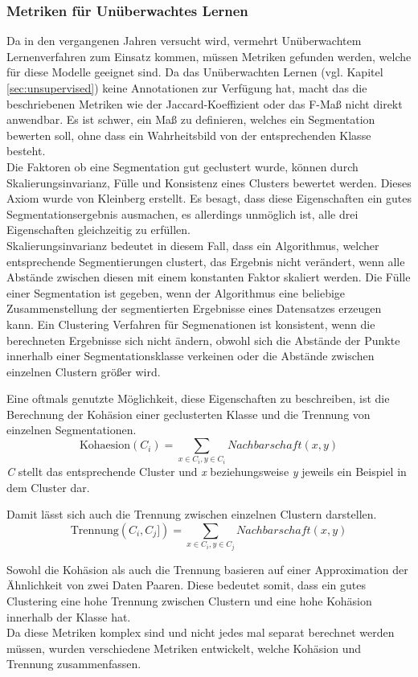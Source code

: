\subsubsection*{Metriken für Unüberwachtes Lernen}
Da in den vergangenen Jahren versucht wird, vermehrt Unüberwachtem Lernenverfahren zum Einsatz kommen, müssen Metriken gefunden werden, welche für diese Modelle geeignet sind. Da das Unüberwachten Lernen (vgl. Kapitel \ref{sec:unsupervised}) keine Annotationen zur Verfügung hat, macht das die beschriebenen Metriken wie der Jaccard-Koeffizient oder das F-Maß nicht direkt anwendbar. Es ist schwer, ein Maß zu definieren, welches ein Segmentation bewerten soll, ohne dass ein Wahrheitsbild von der entsprechenden Klasse besteht.\\
Die Faktoren ob eine Segmentation gut geclustert wurde, können durch Skalierungsinvarianz, Fülle und Konsistenz eines Clusters \cite{evaluationMetricsUnsupervisedLearningAlgorithmsPalacioniño2019} bewertet werden. Dieses Axiom wurde von Kleinberg \cite{clusterAxiomKeinberg2002} erstellt. Es besagt, dass diese Eigenschaften ein gutes Segmentationsergebnis ausmachen, es allerdings unmöglich ist, alle drei Eigenschaften gleichzeitig zu erfüllen.  \\
Skalierungsinvarianz bedeutet in diesem Fall, dass ein Algorithmus, welcher entsprechende Segmentierungen clustert, das Ergebnis nicht verändert, wenn alle Abstände zwischen diesen mit einem konstanten Faktor skaliert werden. Die Fülle einer Segmentation ist gegeben, wenn der Algorithmus eine beliebige Zusammenstellung der segmentierten Ergebnisse eines Datensatzes erzeugen kann. Ein Clustering Verfahren für Segmenationen ist konsistent, wenn die berechneten Ergebnisse sich nicht ändern, obwohl sich die Abstände der Punkte innerhalb einer Segmentationsklasse verkeinen oder die Abstände zwischen einzelnen Clustern größer wird.

Eine oftmals genutzte Möglichkeit, diese Eigenschaften zu beschreiben, ist die Berechnung der Kohäsion einer geclusterten Klasse und die Trennung von einzelnen Segmentationen. 
\[ \text{Kohaesion} (C_{i})  = \sum_{x\in C_{i}, y\in C_{i}} Nachbarschaft(x,y)   \]
\textit{C} stellt das entsprechende Cluster und \textit{x} beziehungsweise \textit{y} jeweils ein Beispiel in dem Cluster dar.

Damit lässt sich auch die Trennung zwischen einzelnen Clustern darstellen. 
\[ \text{Trennung} (C_{i}, C_{j}])  = \sum_{x\in C_{i}, y\in C_{j}} Nachbarschaft(x,y) \]

Sowohl die Kohäsion als auch die Trennung basieren auf einer Approximation der Ähnlichkeit von zwei Daten Paaren. Diese bedeutet somit, dass ein gutes Clustering eine hohe Trennung zwischen Clustern und eine hohe Kohäsion innerhalb der Klasse hat. \\
Da diese Metriken komplex sind und nicht jedes mal separat berechnet werden müssen, wurden verschiedene Metriken entwickelt, welche Kohäsion und Trennung zusammenfassen. 

